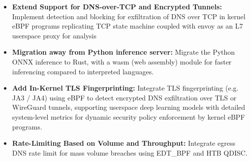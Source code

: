 \documentclass [11pt, proquest] {uwthesis}[2020/02/24]
\begin{document}
\begin{itemize}[itemsep=1pt,parsep=0pt]
  \item \textbf{Extend Support for DNS-over-TCP and Encrypted Tunnels:} Implement detection and blocking for exfiltration of DNS over TCP in kernel eBPF  programs replicating TCP state machine coupled with envoy as an L7 userspace proxy for analysis

  \item \textbf{Migration away from Python inference server:} Migrate the Python ONNX inference to Rust, with a wasm (web assembly) module for faster inferencing compared to interpreted languages.

  \item \textbf{Add In-Kernel TLS Fingerprinting:} Integrate TLS fingerprinting (e.g. JA3 / JA4) using eBPF to detect encrypted DNS exfiltration over TLS or WireGuard tunnels, supporting userspace deep learning models with detailed system-level metrics for dynamic security policy enforcement by kernel eBPF programs.




  \item \textbf{Rate-Limiting Based on Volume and Throughput:} Integrate egress DNS rate limit for mass volume breaches using EDT\_BPF and HTB QDISC.


\end{itemize}
\end{document}

